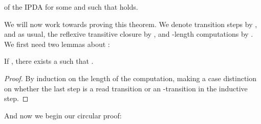 \begin{isabellebody}
\begin{isamarkuptext}
\begin{theorem}
\begin{enumerate}
of the IPDA  for some  and  such that 
 holds.
\end{enumerate}
\end{theorem}

We will now work towards proving this theorem. We denote  transition steps by , 
and as usual, the reflexive transitive closure by , and -length computations by . 
We first need two lemmas about :

\begin{lemma}\label{char_reachable_imp_substring}
If , there exists a \isa{{\isasymzeta}} such that 
\isa{\isafree{{\isasymgamma}}\ {\isacharequal}{\kern0pt}\ \isafree{{\isasymzeta}}\ {\isacharat}{\kern0pt}\ \isafree{{\isasymalpha}}\ {\isacharat}{\kern0pt}\ \isafree{{\isasymdelta}}}.
\begin{proof}
By induction on the length of the computation, making a case distinction on whether the last step is 
a read transition or an \isa{{\isasymepsilon}}-transition in the inductive step.
\end{proof} 
\end{lemma}

And now we begin our circular proof:


\end{isamarkuptext}
\end{isabellebody}
